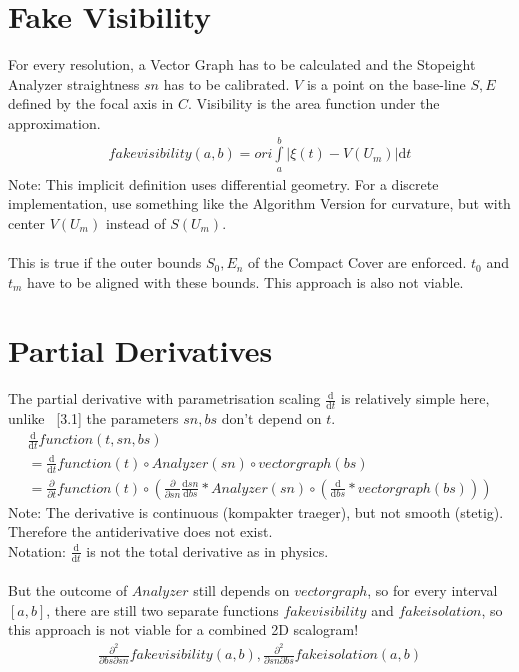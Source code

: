 \documentclass{report}
\begin{document}
\section{Fake Visibility}
For every resolution, a Vector Graph has to be calculated and the Stopeight Analyzer straightness $sn$ has to be calibrated. $V$ is a point on the base-line $S,E$ defined by the focal axis in $C$.
Visibility is the area function under the approximation.
\begin{align}
fakevisibility(a,b)= ori \int \limits _{a}^{b} \vert \xi(t)-V(U_{m})\vert  \mathrm{d}t
\end{align}
Note: This implicit definition uses differential geometry. For a discrete implementation, use something like the Algorithm Version for curvature, but with center $V(U_{m})$ instead of $S(U_{m})$.\\\\
This is true if the outer bounds $S_{0},E_{n}$ of the Compact Cover are enforced. $t_{0}$ and $t_{m}$ have to be aligned with these bounds.
This approach is also not viable.

\section{Partial Derivatives}
The partial derivative with parametrisation scaling $\frac{\mathrm{d}}{\mathrm{d} t}$ is relatively simple here, unlike ~\cite{Analyzer}[3.1] the parameters $sn,bs$ don't depend on $t$.
\begin{align}
\frac{\mathrm{d}}{\mathrm{d} t} function(t,sn,bs)\\
= \frac{\mathrm{d}}{\mathrm{d} t} function(t) \circ Analyzer(sn) \circ vectorgraph(bs)\\
= \frac{\partial}{\partial t} function(t) \circ ( \frac{\partial}{\partial sn}\frac{\mathrm{d}sn}{\mathrm{d}bs}* Analyzer(sn) \circ (\frac{\mathrm{d}}{\mathrm{d} bs} *vectorgraph(bs)) )
\end{align}
Note: The derivative is continuous (kompakter traeger), but not smooth (stetig). Therefore the antiderivative does not exist.\\
Notation: $\frac{\mathrm{d}}{\mathrm{d} t}$ is not the total derivative as in physics.\\\\
But the outcome of $Analyzer$ still depends on $vectorgraph$, so for every interval $[a,b]$, there are still two separate functions $fake visibility$ and $fake isolation$, so this approach is not viable for a combined 2D scalogram!
\begin{align}
\frac{\partial^{2}}{\partial bs\partial sn} fakevisibility(a,b),\frac{\partial^{2}}{\partial sn\partial bs} fakeisolation(a,b)
\end{align}
\end{document}
